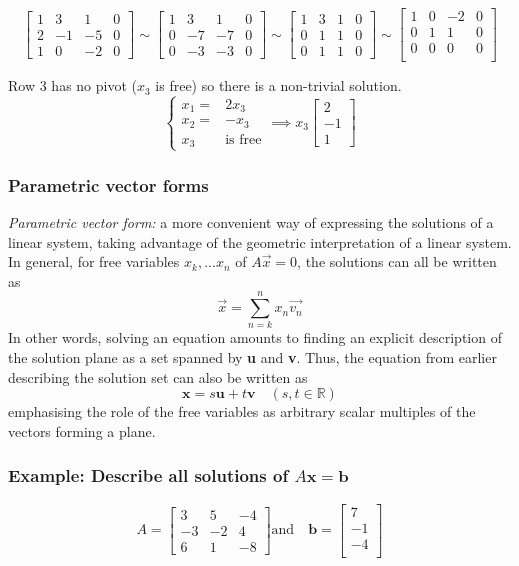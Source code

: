 \documentclass[12pt]{article} %
\newcommand{\R}{\mathbb{R}}
\begin{document}
$$\begin{bmatrix}
	1 & 3 & 1 & 0\\
	2 & -1 & -5 & 0\\
	1 & 0 & -2 & 0
\end{bmatrix} \sim
\begin{bmatrix}
	1 & 3 & 1 & 0\\
	0 & -7 & -7 & 0\\
	0 & -3 & -3 & 0
\end{bmatrix} \sim
\begin{bmatrix}
	1 & 3 & 1 & 0\\
	0 & 1 & 1 & 0\\
	0 & 1 & 1 & 0
\end{bmatrix} \sim
\begin{bmatrix}
	1 & 0 & -2 & 0\\
	0 & 1 & 1 & 0\\
	0 & 0 & 0 & 0\\
\end{bmatrix}$$

Row 3 has no pivot ($x_3$ is free) so there is a non-trivial solution. 
$$
\begin{cases}
	x_1 = &2x_3\\
	x_2 = &-x_3\\
	x_3 &\text{is free}
\end{cases} \implies x_3 \begin{bmatrix} 2 \\ -1\\ 1\end{bmatrix}$$
\pagebreak
\subsubsection{Parametric vector forms}
\emph{Parametric vector form:} a more convenient way of expressing the solutions of a linear system, taking advantage of the geometric interpretation of a linear system. In general, for free variables $x_k, ... x_n$ of $A\vec{x} = 0$, the solutions can all be written as 
$$\vec{x} = \sum_{n=k}^n x_n\vec{v_n}$$
In other words, solving an equation amounts to finding an explicit description of the solution plane as a set spanned by \textbf{u} and \textbf{v}. Thus, the equation from earlier describing the solution set can also be written as 
$$\mathbf{x} = s\mathbf{u} + t\mathbf{v} \quad (s, t \in \R)$$
emphasising the role of the free variables as arbitrary scalar multiples of the vectors forming a plane.

\subsubsection{Example: Describe all solutions of $A\mathbf{x} = \mathbf{b}$}
$$A = \begin{bmatrix}
	3 & 5 & -4\\
	-3 & -2 & 4\\
	6 & 1 & -8
\end{bmatrix} \text{and} \quad \mathbf{b} = \begin{bmatrix}
	7\\
	-1\\
	-4\\
\end{bmatrix}$$
\end{document}
